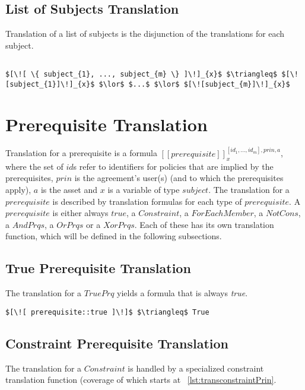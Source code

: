 \subsection{List of Subjects Translation}
Translation of a list of subjects is the disjunction of the translations for each subject.

\lstset{mathescape, language=AST}  
\begin{lstlisting}[frame=single, caption={Prin Translation {$\colon$} List of subjects},label={lst:transprinListOfSubjects}]

$[\![ \{ subject_{1}, ..., subject_{m} \} ]\!]_{x}$ $\triangleq$ $[\![subject_{1}]\!]_{x}$ $\lor$ $...$ $\lor$ $[\![subject_{m}]\!]_{x}$

\end{lstlisting}




\section{Prerequisite Translation}

Translation for a prerequisite is a formula $[\![prerequisite]\!]^{[id_{1}, ..., id_{m}], prin, a}_{x}$, where the set of $id$s refer to identifiers for policies that are implied by the prerequisites, $prin$ is the agreement's user(s) (and to which the prerequisites apply), $a$ is the asset and $x$ is a variable of type $subject$. The translation for a $prerequisite$ is described by translation formulas for each type of $prerequisite$. A $prerequisite$ is either always $true$, a $Constraint$, a $ForEachMember$, a $NotCons$, a $AndPrqs$, a $OrPrqs$ or a $XorPrqs$. Each of these has its own translation function, which will be defined in the following subsections.

\subsection{True Prerequisite Translation}
The translation for a $TruePrq$ yields a formula that is always \emph{true}.

\lstset{mathescape, language=AST}  
\begin{lstlisting}[frame=single, caption={Prerequisite Translation {$\colon$} Always True Prerequisite},label={lst:transpreRequisiteTruePrq}]
	$[\![ prerequisite::true ]\!]$ $\triangleq$ True
\end{lstlisting}

\subsection{Constraint Prerequisite Translation}
The translation for a $Constraint$ is handled by a specialized constraint translation function (coverage of which starts at ~\ref{lst:transconstraintPrin}.


